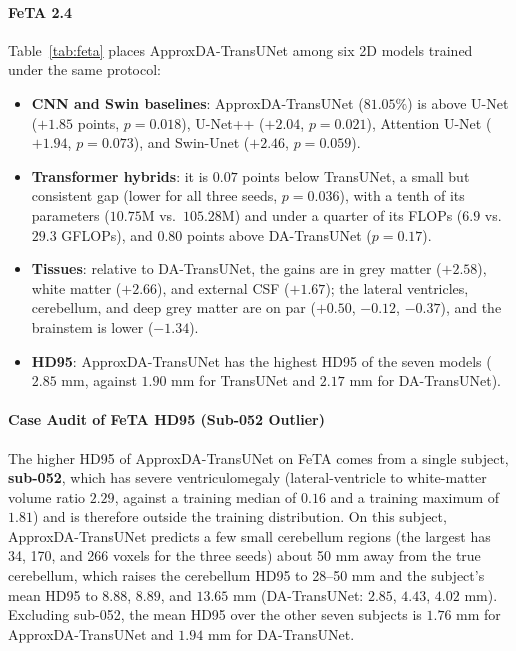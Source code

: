 \paragraph{FeTA 2.4} Table~\ref{tab:feta} places ApproxDA-TransUNet among six 2D models trained under the same protocol:
\begin{itemize}
    \item \textbf{CNN and Swin baselines}: ApproxDA-TransUNet ($81.05\%$) is above U-Net ($+1.85$ points, $p = 0.018$), U-Net++ ($+2.04$, $p = 0.021$), Attention U-Net ($+1.94$, $p = 0.073$), and Swin-Unet ($+2.46$, $p = 0.059$).
    \item \textbf{Transformer hybrids}: it is $0.07$ points below TransUNet, a small but consistent gap (lower for all three seeds, $p = 0.036$), with a tenth of its parameters ($10.75$M vs.\ $105.28$M) and under a quarter of its FLOPs ($6.9$ vs.\ $29.3$ GFLOPs), and $0.80$ points above DA-TransUNet ($p = 0.17$).
    \item \textbf{Tissues}: relative to DA-TransUNet, the gains are in grey matter ($+2.58$), white matter ($+2.66$), and external CSF ($+1.67$); the lateral ventricles, cerebellum, and deep grey matter are on par ($+0.50$, $-0.12$, $-0.37$), and the brainstem is lower ($-1.34$).
    \item \textbf{HD95}: ApproxDA-TransUNet has the highest HD95 of the seven models ($2.85$ mm, against $1.90$ mm for TransUNet and $2.17$ mm for DA-TransUNet).
\end{itemize}

\paragraph{Case Audit of FeTA HD95 (Sub-052 Outlier)}
The higher HD95 of ApproxDA-TransUNet on FeTA comes from a single subject, \textbf{sub-052}, which has severe ventriculomegaly (lateral-ventricle to white-matter volume ratio $2.29$, against a training median of $0.16$ and a training maximum of $1.81$) and is therefore outside the training distribution. On this subject, ApproxDA-TransUNet predicts a few small cerebellum regions (the largest has 34, 170, and 266 voxels for the three seeds) about 50 mm away from the true cerebellum, which raises the cerebellum HD95 to 28--50 mm and the subject's mean HD95 to $8.88$, $8.89$, and $13.65$ mm (DA-TransUNet: $2.85$, $4.43$, $4.02$ mm). Excluding sub-052, the mean HD95 over the other seven subjects is $1.76$ mm for ApproxDA-TransUNet and $1.94$ mm for DA-TransUNet.

